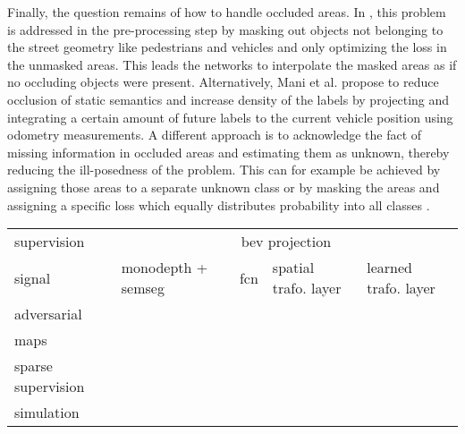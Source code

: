 Finally, the question remains of how to handle occluded areas. In \cite{schulter2018learning}, this problem is addressed in the pre-processing step by masking out objects not belonging to the street geometry like pedestrians and vehicles and only optimizing the loss in the unmasked areas. This leads the networks to interpolate the masked areas as if no occluding objects were present. Alternatively, Mani et al. \cite{mani2020monolayout} propose to reduce occlusion of static semantics and increase density of the labels by projecting and integrating a certain amount of future labels to the current vehicle position using odometry measurements. A different approach is to acknowledge the fact of missing information in occluded areas and estimating them as unknown, thereby reducing the ill-posedness of the problem. This can for example be achieved by assigning those areas to a separate unknown class \cite{reiher2020sim2real} or by masking the areas and assigning a specific loss which equally distributes probability into all classes \cite{roddick2020predicting}. 
\begin{center}
	\begin{tabular}{m{4.0cm}|m{2.5cm}|m{2.0cm}|m{2.5cm}|m{2.5cm}}
		supervision& \multicolumn{4}{c}{\gls{bev} projection}\\
		\cline{2-5}
		signal& \gls{monodepth} + \gls{semseg} & \gls{fcn} & spatial trafo. layer & learned trafo. layer\\
		\hline
		adversarial & \cite{schulter2018learning} & \cite{mani2020monolayout} & & \\
		\hline
		maps & \cite{schulter2018learning,philion2020lift} & \cite{mani2020monolayout} & \cite{roddick2020predicting} & \\
		\hline
		sparse supervision &  & \cite{mani2020monolayout,lu2019monocular} &  &\\
		\hline
		simulation &  & \cite{reiher2020sim2real} & \cite{reiher2020sim2real} & \cite{pan2020cross}
	\end{tabular}
\end{center} 
%
